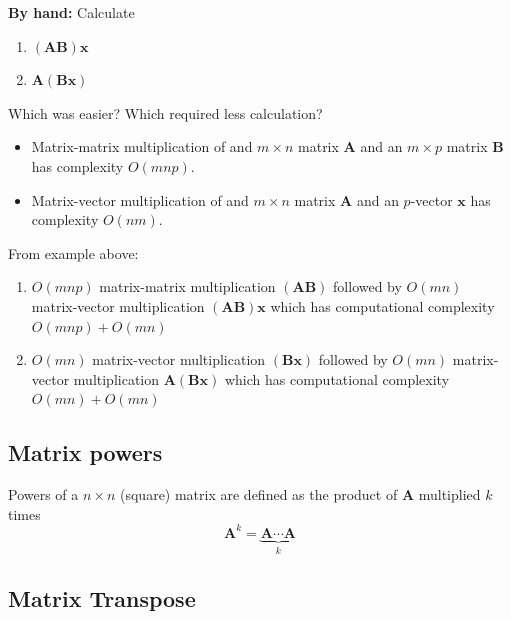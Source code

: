 \documentclass[
]{book}
\theoremstyle{definition}
\theoremstyle{definition}
\theoremstyle{definition}
\theoremstyle{remark}
\begin{document}
\textbf{By hand:} Calculate

\begin{enumerate}
\def\labelenumi{\arabic{enumi})}
\item
  \((\mathbf{A} \mathbf{B}) \mathbf{x}\)
\item
  \(\mathbf{A} (\mathbf{B} \mathbf{x})\)
\end{enumerate}

Which was easier? Which required less calculation?

\begin{itemize}
\item
  Matrix-matrix multiplication of and \(m \times n\) matrix \(\mathbf{A}\) and an \(m \times p\) matrix \(\mathbf{B}\) has complexity \(O(m n p)\).
\item
  Matrix-vector multiplication of and \(m \times n\) matrix \(\mathbf{A}\) and an \(p\)-vector \(\mathbf{x}\) has complexity \(O(n m)\).
\end{itemize}

From example above:

\begin{enumerate}
\def\labelenumi{\arabic{enumi})}
\item
  \(O(m n p)\) matrix-matrix multiplication \((\mathbf{A} \mathbf{B})\) followed by \(O(m n)\) matrix-vector multiplication \((\mathbf{A} \mathbf{B}) \mathbf{x}\) which has computational complexity \(O(m n p) + O(m n)\)
\item
  \(O(m n)\) matrix-vector multiplication \((\mathbf{B} \mathbf{x})\) followed by \(O(m n)\) matrix-vector multiplication \(\mathbf{A} (\mathbf{B} \mathbf{x})\) which has computational complexity \(O(m n) + O(m n)\)
\end{enumerate}

\hypertarget{matrix-powers}{%
\subsection{Matrix powers}\label{matrix-powers}}

Powers of a \(n \times n\) (square) matrix are defined as the product of \(\mathbf{A}\) multiplied \(k\) times
\[
\mathbf{A}^k = \underbrace{\mathbf{A} \cdots \mathbf{A}}_k
\]

\hypertarget{matrix-transpose}{%
\subsection{Matrix Transpose}\label{matrix-transpose}}
\end{document}

